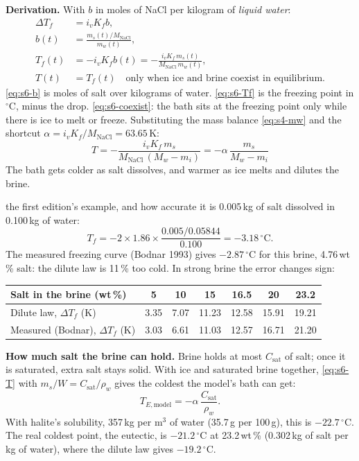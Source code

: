 \documentclass[11pt,a4paper]{article}
\newcommand{\dC}{\,{}^{\circ}\mathrm{C}}
\newcommand{\Csat}{C_{\mathrm{sat}}}
\newcommand{\MN}{M_{\mathrm{NaCl}}}
\newcommand{\para}[1]{\par\smallskip\noindent\textbf{#1}\enspace}
\begin{document}
\para{Derivation.} With $b$ in moles of NaCl per kilogram of \emph{liquid water}:
\begin{align}
\Delta T_f &= i_vK_fb, \label{eq:s6-dTf}\\
b(t) &= \frac{m_s(t)/\MN}{m_w(t)}, \label{eq:s6-b}\\
T_f(t) &= -i_vK_fb(t) = -\frac{i_vK_f\,m_s(t)}{\MN\,m_w(t)}, \label{eq:s6-Tf}\\
T(t) &= T_f(t)\quad\text{only when ice and brine coexist in equilibrium.} \label{eq:s6-coexist}
\end{align}
\eqref{eq:s6-b} is moles of salt over kilograms of water. \eqref{eq:s6-Tf} is the freezing point in
$^\circ$C, minus the drop. \eqref{eq:s6-coexist}: the bath sits at the freezing point only while there is
ice to melt or freeze. Substituting the mass balance \eqref{eq:s4-mw} and the shortcut
$\alpha = i_vK_f/\MN = 63.65$\,K:
\begin{equation}
\boxed{\,T = -\frac{i_vK_f\,m_s}{\MN\,(M_w - m_i)} = -\alpha\,\frac{m_s}{M_w - m_i}\,} \label{eq:s6-T}
\end{equation}
The bath gets colder as salt dissolves, and warmer as ice melts and dilutes the brine.

\begin{worked}{the first edition's example, and how accurate it is}
0.005\,kg of salt dissolved in 0.100\,kg of water:
\begin{equation}
T_f = -2\times1.86\times\frac{0.005/0.05844}{0.100} = -3.18\dC . \label{eq:s6-example}
\end{equation}
The measured freezing curve (Bodnar 1993) gives $-2.87\dC$ for this brine, 4.76\,wt\,\% salt: the dilute
law is 11\,\% too cold. In strong brine the error changes sign:

\begin{center}\small
\begin{tabular}{@{}lcccccc@{}}
\toprule
Salt in the brine (wt\,\%) & 5 & 10 & 15 & 16.5 & 20 & 23.2\\
\midrule
Dilute law, $\Delta T_f$ (K) & 3.35 & 7.07 & 11.23 & 12.58 & 15.91 & 19.21\\
Measured (Bodnar), $\Delta T_f$ (K) & 3.03 & 6.61 & 11.03 & 12.57 & 16.71 & 21.20\\
\bottomrule
\end{tabular}
\end{center}
\end{worked}

\para{How much salt the brine can hold.} Brine holds at most $\Csat$ of salt; once it is saturated, extra
salt stays solid. With ice and saturated brine together, \eqref{eq:s6-T} with $m_s/W = \Csat/\rho_w$ gives
the coldest the model's bath can get:
\begin{equation}
T_{E,\mathrm{model}} = -\alpha\,\frac{\Csat}{\rho_w} . \label{eq:s6-TE}
\end{equation}
With halite's solubility, 357\,kg per m$^3$ of water (35.7\,g per 100\,g), this is $-22.7\dC$. The real
coldest point, the eutectic, is $-21.2\dC$ at 23.2\,wt\,\% (0.302\,kg of salt per kg of water), where the
dilute law gives $-19.2\dC$.
\end{document}
